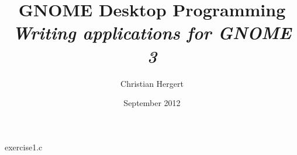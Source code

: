 


\title{
    GNOME Desktop Programming\\
    \textit{Writing applications for GNOME 3}
}
\author{Christian Hergert}
\date{September 2012}



\frontmatter

\maketitle

\tableofcontents



\mainmatter



\begin{code}{exercise1.c}

\end{code}

\appendix



